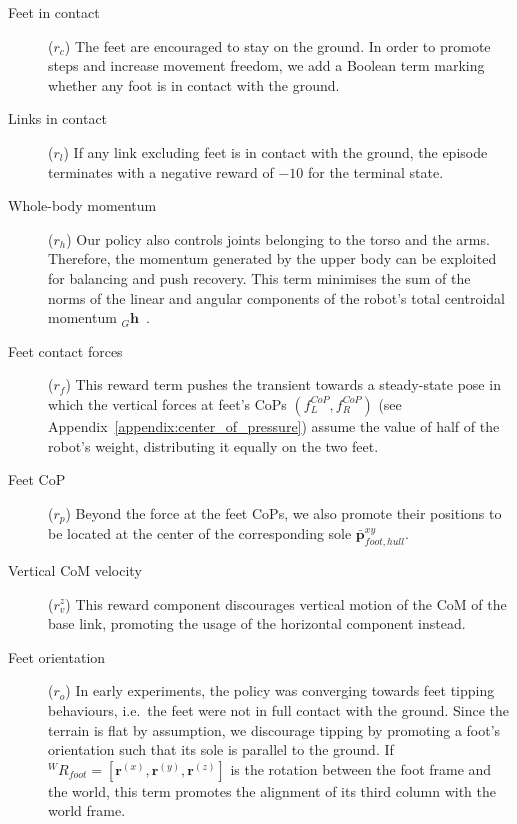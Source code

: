 \begin{description}

\item[Feet in contact]\!($r_c$)\;
%
The feet are encouraged to stay on the ground.
In order to promote steps and increase movement freedom, we add a Boolean term marking whether any foot is in contact with the ground.

\item[Links in contact]\!($r_l$)\;
%
If any link excluding feet is in contact with the ground, the episode terminates with a negative reward of $-10$ for the terminal state.

\item[Whole-body momentum]\!($r_h$)\;
%
Our policy also controls joints belonging to the torso and the arms.
Therefore, the momentum generated by the upper body can be exploited for balancing and push recovery.
This term minimises the sum of the norms of the linear and angular components of the robot's total centroidal momentum ${}_G \mathbf{h}$~\parencite{traversaro_unied_2017}.

\item[Feet contact forces]\!($r_f$)\;
%
This reward term pushes the transient towards a steady-state pose in which the vertical forces at feet's \acp{CoP} $(f^{CoP}_L, f^{CoP}_R)$ (see Appendix~\ref{appendix:center_of_pressure}) assume the value of half of the robot's weight, distributing it equally on the two feet.

\item[Feet CoP]\!($r_p$)\;
%
Beyond the force at the feet \acp{CoP}, we also promote their positions to be located at the center of the corresponding sole $\bar{\boldsymbol{p}}^{xy}_{foot, hull}$.

\item[Vertical CoM velocity]\!($r_{v}^z$)\;
%
This reward component discourages vertical motion of the \ac{CoM} of the base link, promoting the usage of the horizontal component instead.

\item[Feet orientation]\!($r_o$)\;
%
In early experiments, the policy was converging towards feet tipping behaviours, i.e.\ the feet were not in full contact with the ground.
Since the terrain is flat by assumption, we discourage tipping by promoting a foot's orientation such that its sole is parallel to the ground.
If ${}^W R_{foot} = [\mathbf{r}^{(x)}, \mathbf{r}^{(y)}, \mathbf{r}^{(z)}]$ is the rotation between the foot frame and the world, this term promotes the alignment of its third column with the world frame.

\end{description}

